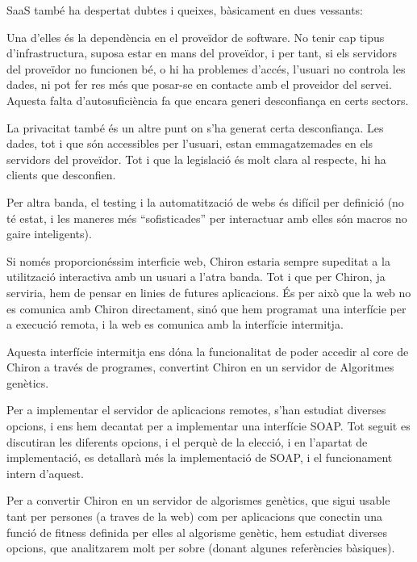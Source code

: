 	   SaaS també ha despertat dubtes i queixes, bàsicament en dues vessants:

	   Una d'elles és la dependència en el proveïdor de software.  No tenir cap tipus
	   d'infrastructura, suposa estar en mans del proveïdor, i per tant, si els
	   servidors del proveïdor no funcionen bé, o hi ha problemes d'accés, l'usuari
	   no controla les dades, ni pot fer res més que posar-se en contacte amb el
	   proveidor del servei.  Aquesta falta d'autosuficiència fa que encara generi
	   desconfiança en certs sectors.

	   La privacitat també és un altre punt on s'ha generat certa desconfiança.  Les
	   dades, tot i que són accessibles per l'usuari, estan emmagatzemades en els
	   servidors del proveïdor.  Tot i que la legislació és molt clara al respecte,
	   hi ha clients que desconfien.

	   Per altra banda, el testing i la automatització de webs és difícil per
	   definició (no té estat, i les maneres més ``sofisticades'' per interactuar amb
			   elles són macros no gaire inteligents).

	   Si només proporcionéssim interficie web, Chiron estaria sempre supeditat a la
	   utilització interactiva amb un usuari a l'atra banda.  Tot i que per Chiron, ja
	   serviria, hem de pensar en linies de futures aplicacions.  És per això que la
	   web no es comunica amb Chiron directament, sinó que hem programat una interfície
	   per a execució remota, i la web es comunica amb la interfície intermitja.

	   Aquesta interfície intermitja ens dóna la funcionalitat de poder accedir al core 
	   de Chiron a través de programes, convertint Chiron en un servidor de Algoritmes
	   genètics.

	   Per a implementar el servidor de aplicacions remotes, s'han estudiat diverses
	   opcions, i ens hem decantat per a implementar una interfície SOAP.  Tot seguit
	   es discutiran les diferents opcions, i el perquè de la elecció, i en l'apartat
	   de implementació, es detallarà més la implementació de SOAP, i el funcionament
	   intern d'aquest.


	   Per a convertir Chiron en un servidor de algorismes genètics, que sigui usable
	   tant per persones (a traves de la web) com per aplicacions que conectin una
	   funció de fitness definida per elles al algorisme genètic, hem estudiat diverses
	   opcions, que analitzarem molt per sobre (donant algunes referències bàsiques).

